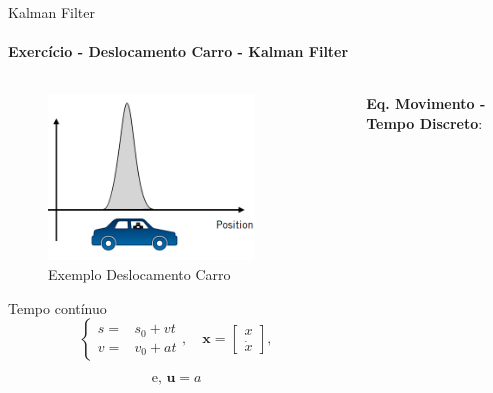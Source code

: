 \documentclass[aspectratio=169]{beamer}
\begin{document}
\begin{frame}[c]{Kalman Filter}
    \framesubtitle{Exercício - Deslocamento Carro - Kalman Filter}    \begin{columns}
        \begin{column}[c]{0.4\textwidth}
            \begin{figure}
                \centering
                \includegraphics[width=0.8\textwidth]{./images/kalman_car.png}
                \caption{Exemplo Deslocamento Carro}
            \end{figure}
        
        Tempo contínuo
        \begin{equation*}
           \left\{
            \begin{matrix}
                s = & s_0 + vt \\
                v = & v_0 + at
            \end{matrix}, 
            \quad
            \mathbf{x} = 
            \begin{bmatrix}
                x \\
                \dot{x}
            \end{bmatrix},
            \right.
        \end{equation*}
        
        \begin{equation*}
            \text{e, }\mathbf{u}=a
        \end{equation*}

        \end{column}
        \begin{column}[c]{0.6\textwidth}
            
            \textbf{Eq. Movimento - Tempo Discreto}:


\end{column}
\end{columns}
\end{frame}
\end{document}
